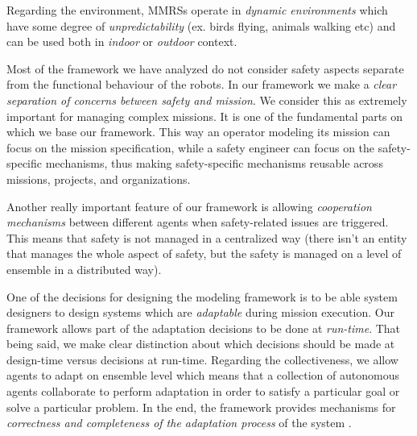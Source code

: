 \documentclass[journal]{IEEEtran}
\theoremstyle{definition}
\newcommand\ivano[1]{\nb{Ivano}{#1}}
\begin{document}
Regarding the environment, MMRSs operate in \textit{dynamic environments} which have some degree of \textit{unpredictability} (ex. birds flying, animals walking etc) and can be used both in \textit{indoor} or \textit{outdoor} context.

Most of the framework we have analyzed do not consider safety aspects separate from the functional behaviour of the robots. In our framework we make a \textit{clear separation of concerns between safety and mission}. We consider this as extremely important for managing complex missions. It is one of the fundamental parts on which we base our framework. This way an operator modeling its mission can focus on the mission specification, while a safety engineer can focus on the safety-specific mechanisms, thus making safety-specific mechanisms reusable across missions, projects, and organizations.

Another really important feature of our framework is allowing \textit{cooperation mechanisms} between different agents when safety-related issues are triggered. This means that safety is not managed in a centralized way (there isn't an  entity that manages the whole aspect of safety, but the safety is managed on a level of ensemble in a distributed way).

One of the decisions for designing the modeling framework is to be able system designers to design systems which are \textit{adaptable} during mission execution. Our framework allows part of the adaptation decisions to be done at \textit{run-time}. That being said, we make clear distinction about which decisions should be made at design-time versus decisions at run-time. Regarding the collectiveness, we allow agents to adapt on ensemble level which means that a collection of autonomous agents collaborate to perform adaptation in order to satisfy a particular goal or solve a particular problem. 
In the end, the framework provides mechanisms for \textit{correctness and completeness of the adaptation process} of the system \ivano{what is the meaning of this sentence?}.


\end{document}

